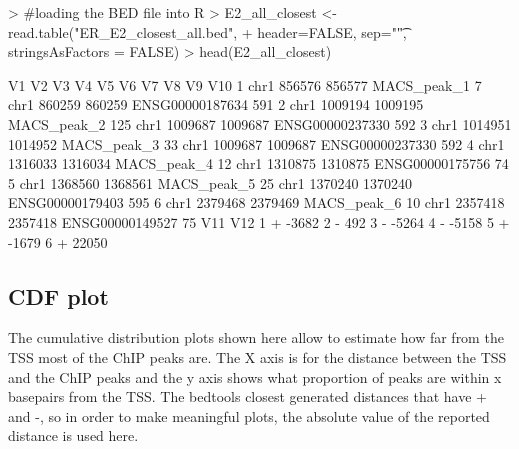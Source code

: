 \documentclass[a4paper,11pt]{article}
\begin{document}
\begin{Schunk}
\begin{Sinput}
> #loading the BED file into R
> E2_all_closest <- read.table("ER_E2_closest_all.bed", 
+               header=FALSE, sep="\t", stringsAsFactors = FALSE)
> head(E2_all_closest)
\end{Sinput}
\begin{Soutput}
    V1      V2      V3          V4  V5   V6      V7      V8              V9 V10
1 chr1  856576  856577 MACS_peak_1   7 chr1  860259  860259 ENSG00000187634 591
2 chr1 1009194 1009195 MACS_peak_2 125 chr1 1009687 1009687 ENSG00000237330 592
3 chr1 1014951 1014952 MACS_peak_3  33 chr1 1009687 1009687 ENSG00000237330 592
4 chr1 1316033 1316034 MACS_peak_4  12 chr1 1310875 1310875 ENSG00000175756  74
5 chr1 1368560 1368561 MACS_peak_5  25 chr1 1370240 1370240 ENSG00000179403 595
6 chr1 2379468 2379469 MACS_peak_6  10 chr1 2357418 2357418 ENSG00000149527  75
  V11   V12
1   + -3682
2   -   492
3   - -5264
4   - -5158
5   + -1679
6   + 22050
\end{Soutput}
\end{Schunk}

\subsection{CDF plot}
The cumulative distribution plots shown here allow to estimate how far from the TSS most of the ChIP peaks are. The X axis is for the distance between the TSS and the ChIP peaks and the y axis shows what proportion of peaks are within x basepairs from the TSS. The bedtools closest generated distances that have + and -, so in order to make meaningful plots, the absolute value of the reported distance is used here.
\end{document}
